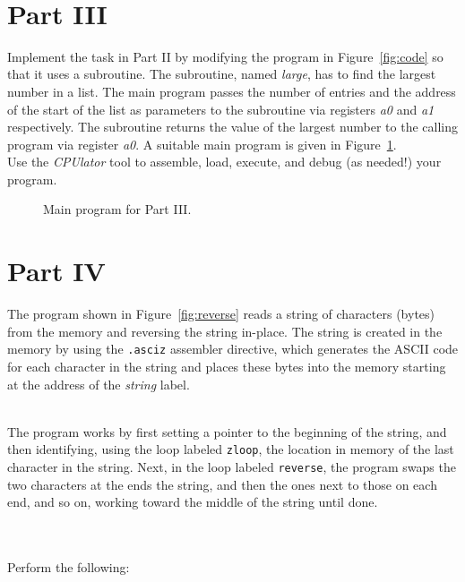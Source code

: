 \documentclass[epsfig,10pt,fullpage]{article}
\begin{document}
~\\
\section*{Part III}

Implement the task in Part II by modifying the program in Figure~\ref{fig:code} so that it
uses a subroutine. The subroutine, named {\it large}, has to find the largest number in a list.
The main program passes the number of entries and the address of the start of the
list as parameters to the subroutine via registers {\it a0} and {\it a1} respectively.
The subroutine returns the value of the largest number to the calling program
via register {\it a0}. A suitable main program is given in Figure~\ref{fig:main}.
~\\

\noindent
Use the {\it CPUlator} tool to assemble, load, execute, and debug (as needed!) your program. 

\begin{figure}[h]
\begin{center}

\end{center}
\caption{Main program for Part III.}
\label{fig:main}
\end{figure}

\newpage
\section*{Part IV}

The program shown in Figure~\ref{fig:reverse} reads a string of characters (bytes) from
the memory and reversing the string in-place. The string is created in the memory by using
the \texttt{.asciz} assembler directive, which generates the ASCII code for each character
in the string and places these bytes into the memory starting at the address of 
the {\it string} label.

~\\
\noindent
The program works by first setting a pointer
to the beginning of the string, and then identifying, using the loop labeled 
\texttt{zloop}, the location in memory of the last character in the string. Next, in the 
loop labeled \texttt{reverse}, the program swaps the two characters 
at the ends the string, and then the ones next to those on each end,
and so on, working toward the middle of the string until done. 

~\\
\noindent
~\\
\noindent
Perform the following:
\end{document}
